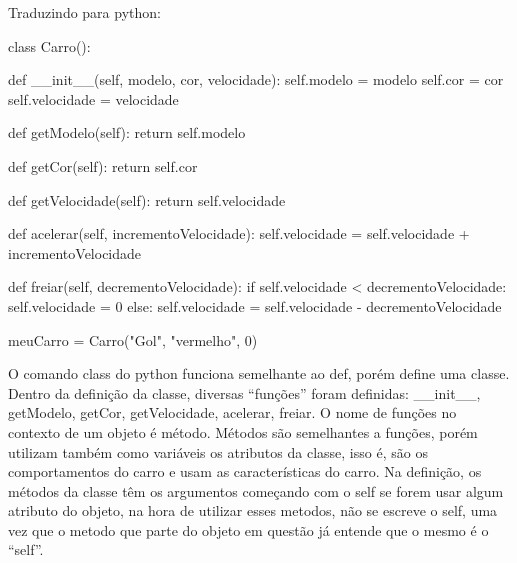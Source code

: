 \documentclass[
  letterpaper,
  DIV=11,
  numbers=noendperiod]{scrreprt}
\newenvironment{Shaded}{\begin{snugshade}}{\end{snugshade}}
\newcommand{\ControlFlowTok}[1]{\textcolor[rgb]{0.00,0.23,0.31}{#1}}
\newcommand{\DecValTok}[1]{\textcolor[rgb]{0.68,0.00,0.00}{#1}}
\newcommand{\FunctionTok}[1]{\textcolor[rgb]{0.28,0.35,0.67}{#1}}
\newcommand{\KeywordTok}[1]{\textcolor[rgb]{0.00,0.23,0.31}{#1}}
\newcommand{\NormalTok}[1]{\textcolor[rgb]{0.00,0.23,0.31}{#1}}
\newcommand{\OperatorTok}[1]{\textcolor[rgb]{0.37,0.37,0.37}{#1}}
\newcommand{\StringTok}[1]{\textcolor[rgb]{0.13,0.47,0.30}{#1}}
\newcommand{\VariableTok}[1]{\textcolor[rgb]{0.07,0.07,0.07}{#1}}
\begin{document}
Traduzindo para python:

\begin{Shaded}
\begin{Highlighting}[]
\KeywordTok{class}\NormalTok{ Carro():}
    
    \KeywordTok{def} \FunctionTok{\_\_init\_\_}\NormalTok{(}\VariableTok{self}\NormalTok{, modelo, cor, velocidade):}
        \VariableTok{self}\NormalTok{.modelo }\OperatorTok{=}\NormalTok{ modelo}
        \VariableTok{self}\NormalTok{.cor }\OperatorTok{=}\NormalTok{ cor}
        \VariableTok{self}\NormalTok{.velocidade }\OperatorTok{=}\NormalTok{ velocidade}
    
    \KeywordTok{def}\NormalTok{ getModelo(}\VariableTok{self}\NormalTok{):}
        \ControlFlowTok{return} \VariableTok{self}\NormalTok{.modelo}
    
    \KeywordTok{def}\NormalTok{ getCor(}\VariableTok{self}\NormalTok{):}
        \ControlFlowTok{return} \VariableTok{self}\NormalTok{.cor}
    
    \KeywordTok{def}\NormalTok{ getVelocidade(}\VariableTok{self}\NormalTok{):}
        \ControlFlowTok{return} \VariableTok{self}\NormalTok{.velocidade }

    \KeywordTok{def}\NormalTok{ acelerar(}\VariableTok{self}\NormalTok{, incrementoVelocidade):}
        \VariableTok{self}\NormalTok{.velocidade }\OperatorTok{=} \VariableTok{self}\NormalTok{.velocidade }\OperatorTok{+}\NormalTok{ incrementoVelocidade }

    \KeywordTok{def}\NormalTok{ freiar(}\VariableTok{self}\NormalTok{, decrementoVelocidade):}
        \ControlFlowTok{if} \VariableTok{self}\NormalTok{.velocidade }\OperatorTok{\textless{}}\NormalTok{ decrementoVelocidade:}
            \VariableTok{self}\NormalTok{.velocidade }\OperatorTok{=} \DecValTok{0}
        \ControlFlowTok{else}\NormalTok{:}
            \VariableTok{self}\NormalTok{.velocidade }\OperatorTok{=} \VariableTok{self}\NormalTok{.velocidade }\OperatorTok{{-}}\NormalTok{ decrementoVelocidade }


\NormalTok{meuCarro }\OperatorTok{=}\NormalTok{ Carro(}\StringTok{"Gol"}\NormalTok{, }\StringTok{"vermelho"}\NormalTok{, }\DecValTok{0}\NormalTok{)}
\end{Highlighting}
\end{Shaded}

O comando class do python funciona semelhante ao def, porém define uma
classe. Dentro da definição da classe, diversas ``funções'' foram
definidas: \_\_init\_\_, getModelo, getCor, getVelocidade, acelerar,
freiar. O nome de funções no contexto de um objeto é método. Métodos são
semelhantes a funções, porém utilizam também como variáveis os atributos
da classe, isso é, são os comportamentos do carro e usam as
características do carro. Na definição, os métodos da classe têm os
argumentos começando com o self se forem usar algum atributo do objeto,
na hora de utilizar esses metodos, não se escreve o self, uma vez que o
metodo que parte do objeto em questão já entende que o mesmo é o
``self''.
\end{document}
